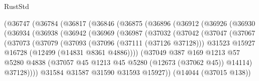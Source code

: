 \begin{lexlean}{RustStd}
\begin{coremodule}
                (@36747
                  (@36784
                    (@36817
                      (@36846
                        (@36875
                          (@36896
                            (@36912
                              (@36926
                                (@36930
                                  (@36934
                                    (@36938
                                      (@36942
                                        (@36969
                                          (@36987
                                            (@37032
                                              (@37042
                                                (@37047
                                                  (@37067
                                                    (@37073
                                                      (@37079
                                                        (@37093
                                                          (@37096 (@37111 (@37126 @37128)))
                                                          @31523
                                                          @15927
                                                          @16728
                                                          (@12499 (@14831 @8361 @4886))))
                                                      (@37049
                                                        @387
                                                        @169
                                                        @1213
                                                        @57
                                                        @5280
                                                        @4838
                                                        (@37057
                                                          @45
                                                          @1213
                                                          @45
                                                          @5280
                                                          (@12673 (@37062 @45))
                                                          @14114)
                                                        @37128))))
                                                @31584
                                                @31587
                                                @31590
                                                @31593
                                                @15927))
                                            (@14044 (@37015 @138))

\end{coremodule}
\end{lexlean}
